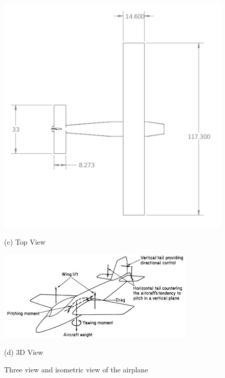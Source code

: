 \begin{figure}[H]
\begin{minipage}{0.6\textwidth}
\begin{centering}
\includegraphics[width=\textwidth]{figures/top.png}
\centerline{\small (c) Top View}
\end{centering}
\end{minipage}
\hspace{2mm}
\begin{minipage}{0.4\textwidth}
\begin{centering}
\includegraphics[width=\textwidth]{figures/3D.png}
\centerline{\small (d) 3D View}
\end{centering}
\end{minipage}
\caption{Three view and isometric view of the airplane}
\label{fig:3view}
\end{figure}
%
%
